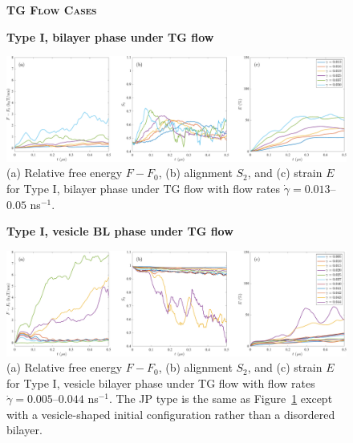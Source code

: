 \begin{figure}[h!]
\begin{center}
\textbf{\textsc{TG Flow Cases}}\par\medskip
\textbf{Type I, bilayer  phase under TG flow}\par\medskip
\includegraphics[width=\textwidth]{SMFigures/ULTGRaw.pdf}
\end{center}
\caption{(a) Relative free energy $F - F_0$, (b) alignment $S_2$, and
  (c) strain $E$ for Type I, bilayer phase under TG flow with flow 
  rates $\dot\gamma=0.013$--$0.05$ ns$^{-1}$.
}
\label{fig:ultgraw}
\end{figure}


\begin{figure}[h!]
\begin{center}
\textbf{Type I, vesicle BL phase under TG flow}\par\medskip
\includegraphics[width=\textwidth]{SMFigures/VeTGRaw.pdf}
\end{center}
\caption{(a) Relative free energy $F - F_0$, (b) alignment $S_2$, and
  (c) strain $E$ for Type I, vesicle bilayer phase under TG flow with
  flow rates $\dot\gamma=0.005$--$0.044$ ns$^{-1}$. The JP type is the
  same as Figure~\ref{fig:ultgraw} except with a vesicle-shaped initial
  configuration rather than a disordered bilayer.
}
\label{fig:vetgraw}
\end{figure}




